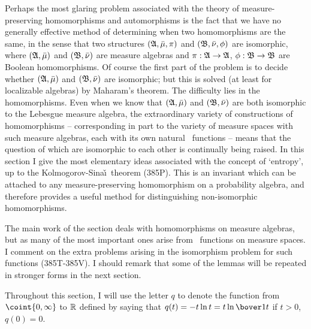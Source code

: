      
\def\AmuA{\Aut_{\bar\mu}\frak A}

\def\chaptername{Automorphisms}
\def\sectionname{Entropy}
     
     
Perhaps the most glaring problem associated with the theory of
measure-preserving homomorphisms and automorphisms is the fact that we
have no generally effective method of determining when two homomorphisms
are the same, in the sense that two structures $(\frak A,\bar\mu,\pi)$
and $(\frak B,\bar\nu,\phi)$ are isomorphic, where $(\frak A,\bar\mu)$
and $(\frak B,\bar\nu)$ are measure algebras and $\pi:\frak A\to\frak
A$, $\phi:\frak B\to\frak B$ are Boolean homomorphisms.   Of course the
first part of the problem is to decide whether $(\frak A,\bar\mu)$ and
$(\frak B,\bar\nu)$ are isomorphic;  but this is solved (at least for
localizable algebras) by Maharam's theorem.   The difficulty
lies in the homomorphisms.   Even when we know that $(\frak A,\bar\mu)$
and $(\frak B,\bar\nu)$ are both isomorphic to the Lebesgue measure
algebra, the extraordinary variety of constructions of
homomorphisms -- corresponding in part to the variety of
measure spaces with such measure
algebras, each with its own natural \imp\ functions -- means that the
question of which are isomorphic to each other is continually being
raised.   In this section I give the most elementary ideas associated
with the concept of `entropy', up to the Kolmogorov-Sina\v\i\ theorem
(385P).   This is an invariant which can be attached to any
measure-preserving homomorphism on a probability algebra, and therefore
provides a useful method for distinguishing non-isomorphic
homomorphisms.
     
The main work of the section deals with homomorphisms on measure
algebras, but as many of the most important ones arise from \imp\
functions on measure spaces.   I comment on the extra problems arising in the isomorphism problem for such functions (385T-385V).   I should
remark that some of the lemmas will be repeated in stronger forms in the
next section.
     
Throughout this section, I will use the letter
$q$ to denote the function from $\coint{0,\infty}$ to $\Bbb R$
defined by saying that $q(t)=-t\ln t=t\ln\bover1t$ if $t>0$, $q(0)=0$.
     
\def\Caption{The function $q$}
     
